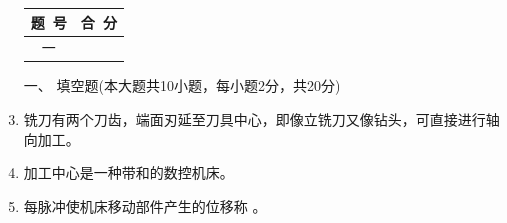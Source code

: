 \documentclass[12pt,twocolumn,landscape,UTF8,twoside]{ctexart}
\begin{document}
\begin{spacing}{1.3}
	\begin{enumerate} [1、]
		
\item[\heiti \begin{minipage}{\@}\begin{tabular}{|c|c|}
\hline	题~号 & 合~分\\ \hline 一& \\\hline\end{tabular}	\end{minipage} ]
	
\item [\heiti 一、 ]{\heiti 填空题(本大题共10小题，每小题2分，共20分)}
		
		
		
		
		\item {}铣刀有两个刀齿，端面刃延至刀具中心，即像立铣刀又像钻头，可直接进行轴向加工。
		
		\item 加工中心是一种带和的数控机床。


		\item 每脉冲使机床移动部件产生的位移称  		。

		



\end{enumerate}
\end{spacing}
\end{document}
